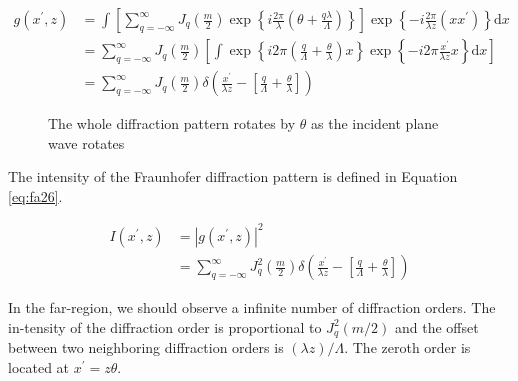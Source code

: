 \documentclass[main.tex]{subfiles}
\begin{document}
\begin{enumerate}
\begin{enumerate}
\begin{equation}\label{eq:fa25}
\begin{aligned} 
g\left(x^{\prime}, z\right)&= \int\left[\sum_{q=-\infty}^{\infty} J_{q}\left(\frac{m}{2}\right) \exp \left\{i \frac{2 \pi}{\lambda}\left(\theta+\frac{q \lambda}{\Lambda}\right)\right\}\right] \exp \left\{-i \frac{2 \pi}{\lambda z}\left(x x^{\prime}\right)\right\} \mathrm{d} x \\
&=\sum_{q=-\infty}^{\infty} J_{q}\left(\frac{m}{2}\right)\left[\int \exp \left\{i 2 \pi\left(\frac{q}{\Lambda}+\frac{\theta}{\lambda}\right) x\right\} \exp \left\{-i 2 \pi \frac{x^{\prime}}{\lambda z} x\right\} \mathrm{d} x\right] \\
&=\sum_{q=-\infty}^{\infty} J_{q}\left(\frac{m}{2}\right) \delta\left(\frac{x^{\prime}}{\lambda z}-\left[\frac{q}{\Lambda}+\frac{\theta}{\lambda}\right]\right)
\end{aligned} 
\end{equation}

\begin{figure}
\centering{}
\caption{The whole diffraction pattern rotates by $\theta$ as the incident plane wave rotates}
\label{fig:fa21}
\end{figure}

The intensity of the Fraunhofer diffraction pattern is defined in Equation \ref{eq:fa26}.

\begin{equation}\label{eq:fa26}
\begin{aligned} 
I\left(x^{\prime}, z\right)&= \left|g\left(x^{\prime}, z\right)\right|^{2}\\
&=\sum_{q=-\infty}^{\infty} J_{q}^{2}\left(\frac{m}{2}\right) \delta\left(\frac{x^{\prime}}{\lambda z}-\left[\frac{q}{\Lambda}+\frac{\theta}{\lambda}\right]\right)
\end{aligned} 
\end{equation}

In the far-region, we should observe a infinite number of diffraction orders. The in-tensity of the diffraction order is proportional to $J_q^2(m/2)$ and the offset between two neighboring diffraction orders is $(\lambda z)/\Lambda$. The zeroth order is located at $x^{\prime}=z\theta$.


\end{enumerate}
\end{enumerate}
\end{document}
